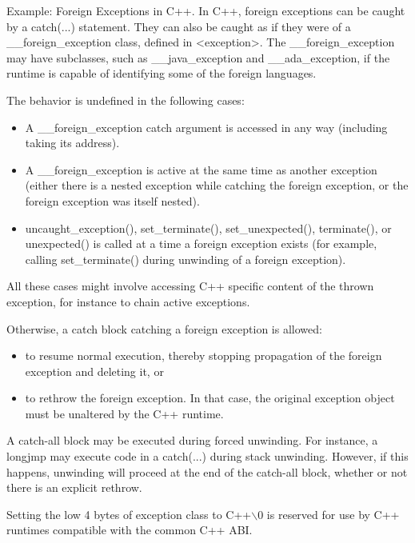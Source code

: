 Example: Foreign Exceptions in C++. In C++, foreign exceptions can be 
caught by a catch(...) statement. They can also be caught
as if they were of a \_\_foreign\_exception class, 
defined in <exception>. The \_\_foreign\_exception may have subclasses,
such as \_\_java\_exception and \_\_ada\_exception, if the runtime is 
capable of identifying some of the foreign languages. 

The behavior is undefined in the following cases: 
\begin{itemize}
\item A \_\_foreign\_exception catch argument is accessed in any way 
     (including taking its address). 

\item A \_\_foreign\_exception is active at the same time as another 
     exception (either there is a nested exception while catching the
     foreign exception, or the foreign exception was itself nested). 

\item uncaught\_exception(), set\_terminate(), set\_unexpected(), terminate(), 
     or unexpected() is called at a time a foreign exception exists 
     (for example, calling set\_terminate() during unwinding of a 
     foreign exception). 
\end{itemize}

All these cases might involve accessing C++ specific content of the 
thrown exception, for instance to chain active exceptions. 

Otherwise, a catch block catching a foreign exception is allowed: 
\begin{itemize}
\item to resume normal execution, thereby stopping propagation of 
      the foreign exception and deleting it, or 
\item to rethrow the foreign exception. In that case, the original 
      exception object must be unaltered by the C++ runtime. 
\end{itemize}

A catch-all block may be executed during forced unwinding. 
For instance, a longjmp may execute code in a catch(...) during stack
unwinding. However, if this happens, unwinding will proceed at the end 
of the catch-all block, whether or not there is an explicit rethrow. 

Setting the low 4 bytes of exception class to C++$\backslash$0 is reserved 
for use by C++ runtimes compatible with the common C++ ABI. 

